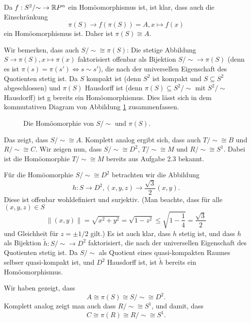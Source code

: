 \documentclass[a4paper,10pt]{article}
\begin{document}
Da $f : S^2/{\sim} \to \mathbb{R} P^n$ ein Homöomorphismus ist, ist klar, dass auch die Einschränkung
\[
 \pi(S) \to f(\pi(S)) = A, x \mapsto f(x)
\]
ein Homöomorphismus ist. Daher ist $\pi(S) \cong A$.

Wir bemerken, dass auch $S/{\sim} \cong \pi(S)$: Die stetige Abbildung $S \to \pi(S), x \mapsto \pi(x)$ faktorisiert offenbar als Bijektion $S/{\sim} \to \pi(S)$ (denn es ist $\pi(s) = \pi(s') \Leftrightarrow s \sim s'$), die nach der universellen Eigenschaft des Quotienten stetig ist. Da $S$ kompakt ist (denn $S^2$ ist kompakt und $S \subseteq S^2$ abgeschlossen) und $\pi(S)$ Hausdorff ist (denn $\pi(S) \subseteq S^2/{\sim}$ mit $S^2/{\sim}$ Hausdorff) ist g bereits ein Homöomorphismus. Dies lässt sich in dem kommutativen Diagram von Abbildung \ref{fig: S/sim pi(S)} zusammenfassen.
\begin{figure}\centering
 \caption{Die Homöomorphie von $S/{\sim}$ und $\pi(S)$.}
 \label{fig: S/sim pi(S)}
\end{figure}

Das zeigt, dass $S/{\sim} \cong A$. Komplett analog ergibt sich, dass auch $T/{\sim} \cong B$ und $R/{\sim} \cong C$. Wir zeigen nun, dass $S/{\sim} \cong D^2$, $T/{\sim} \cong M$ und $R/{\sim} \cong S^1$. Dabei ist die Homöomorphie $T/{\sim} \cong M$ bereits aus Aufgabe 2.3 bekannt.

Für die Homöomorphie $S/{\sim} \cong D^2$ betrachten wir die Abbildung
\[
 h : S \to D^2, (x,y,z) \to \frac{\sqrt{3}}{2}(x,y).
\]
Diese ist offenbar wohldefiniert und surjektiv. (Man beachte, dass für alle $(x,y,z) \in S$
\[
 \|(x,y)\| = \sqrt{x^2+y^2} = \sqrt{1-z^2} \leq \sqrt{1-\frac{1}{4}} = \frac{\sqrt{3}}{2}
\]
und Gleichheit für $z = \pm 1/2$ gilt.) Es ist auch klar, dass $h$ stetig ist, und dass $h$ als Bijektion $\tilde{h} : S/{\sim} \to D^2$ faktorisiert, die nach der universellen Eigenschaft des Quotienten stetig ist. Da $S/{\sim}$ als Quotient eines quasi-kompakten Raumes selbser quasi-kompakt ist, und $D^2$ Hausdorff ist, ist $\tilde{h}$ bereits ein Homöomorphismus.

Wir haben gezeigt, dass
\[
 A \cong \pi(S) \cong S/{\sim} \cong D^2.
\]
Komplett analog zeigt man auch dass $R/{\sim} \cong S^1$, und damit, dass
\[
 C \cong \pi(R) \cong R/{\sim} \cong S^1.
\]
\end{document}
